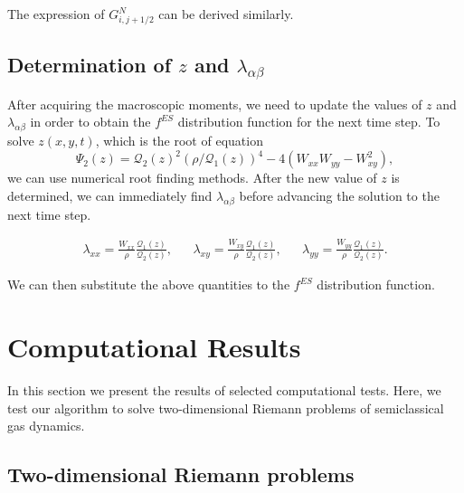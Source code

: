\documentclass{rsproca}%
\begin{document}
The expression of $G_{i,j+1/2}^N$ can be derived similarly.

\subsection{ Determination of $z$ and $\lambda_{\alpha \beta}$ }

After acquiring the macroscopic moments, we need to update the values of $z$ and $\lambda_{\alpha \beta}$ in order to obtain the $f^{ES}$ distribution function for the next time step.  To solve $z(x,y,t)$, which is the root of equation
\begin{equation}
	\Psi_2(z)=\mathcal{Q}_{2}(z)^2 (\rho/\mathcal{Q}_{1}(z))^{4} - 4 (W_{xx} W_{yy} - W_{xy}^2),
\end{equation}
we can use numerical root finding methods.  After the new value of $z$ is determined, we can immediately find $\lambda_{\alpha \beta}$ before advancing the solution to the next time step.

\begin{align}
&\lambda_{xx} = \frac{W_{xx}}{\rho} \frac{\mathcal{Q}_{1}(z)}{\mathcal{Q}_{2}(z)},&
&\lambda_{xy} = \frac{W_{xy}}{\rho} \frac{\mathcal{Q}_{1}(z)}{\mathcal{Q}_{2}(z)},&
&\lambda_{yy} = \frac{W_{yy}}{\rho} \frac{\mathcal{Q}_{1}(z)}{\mathcal{Q}_{2}(z)}.&
\end{align}

We can then substitute the above quantities to the $f^{ES}$ distribution function.

\section{Computational Results}
\label{results}

In this section we present the results of selected computational tests.  Here, we test our algorithm to solve two-dimensional Riemann problems of semiclassical gas dynamics.

\subsection{Two-dimensional Riemann problems}
\label{Riemannp}
\end{document}
